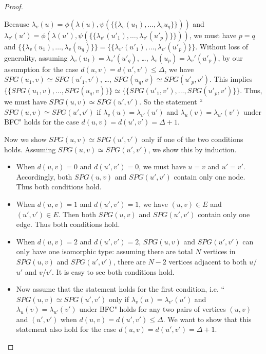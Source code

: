 \begin{proof}
\begin{itemize}
    Because $\lambda_v(u) = \phi(\lambda(u), \psi(\{\!\!\{ \lambda_v(u_1), \dots, \lambda_v{u_q}\}\!\!\}))$ and $\lambda_{v'}(u') = \phi(\lambda(u'), \psi(\{\!\!\{ \lambda_{v'}(u'_1), \dots, \lambda_{v'}(u'_p)\}\!\!\}))$,  we must have $p=q$ and $\{\!\!\{\lambda_v(u_1),\dots, \lambda_v(u_q)\}\!\!\} = \{\!\!\{\lambda_{v'}(u'_1),\dots, \lambda_{v'}(u'_p)\}\!\!\}$.
    Without loss of generality, assuming $\lambda_v(u_1)=\lambda_v'(u'_q)$, \dots, $\lambda_v(u_p)=\lambda_v'(u'_p)$, 
    by our assumption for the case $d(u,v)=d(u',v')\leq \Delta$,
    we have $SPG(u_1,v)\simeq SPG(u'_1, v')$, \dots, $SPG(u_q,v)\simeq SPG(u'_p, v')$. This implies $\{\!\!\{SPG(u_1,v),\dots, SPG(u_q,v)\}\!\!\}\simeq \{\!\!\{SPG(u'_1,v'),\dots, SPG(u'_p,v')\}\!\!\}$. Thus, we must have $SPG(u,v)\simeq SPG(u',v')$.
    So the statement ``$SPG(u,v)\simeq SPG(u',v')$ if $\lambda_v(u)= \lambda_{v'}(u')$ and $\lambda_u(v)= \lambda_{u'}(v')$ under BFC" holds  for the case $d(u,v)=d(u',v')= \Delta+1$.
\end{itemize}


Now we show $SPG(u,v)\simeq SPG(u',v')$ only if one of the two conditions holds.
Assuming $SPG(u,v)\simeq SPG(u',v')$, we show this by induction.

\begin{itemize}
    \item When $d(u,v)=0$ and $d(u',v')=0$, we must have $u=v$ and $u'=v'$. Accordingly, both $SPG(u,v)$ and $SPG(u',v')$ contain only one node. Thus both conditions hold.
    \item When $d(u,v)=1$ and $d(u',v')=1$, we have $(u,v)\in E$ and $(u',v')\in E$. Then both $SPG(u,v)$ and $SPG(u',v')$ contain only one edge. Thus both conditions hold.
    \item When $d(u,v)=2$ and $d(u',v')=2$, $SPG(u,v)$ and $SPG(u',v')$ can only have one isomorphic type: assuming there are total $N$ vertices in $SPG(u,v)$ and $SPG(u',v')$, there are $N-2$ vertices adjacent to both $u$/$u'$ and $v$/$v'$. It is easy to see both conditions hold.
    
    \item Now assume that the statement holds for the first condition, i.e. ``$SPG(u,v)\simeq SPG(u',v')$ only if $\lambda_v(u)= \lambda_{v'}(u')$ and $\lambda_u(v)= \lambda_{u'}(v')$ under BFC" holds for any two pairs of vertices $(u,v)$ and $(u',v')$ when $d(u,v)=d(u',v')\leq \Delta$. We want to show that this statement also hold for the case $d(u,v)=d(u',v')= \Delta+1$. 
    

\end{itemize}
\end{proof}
